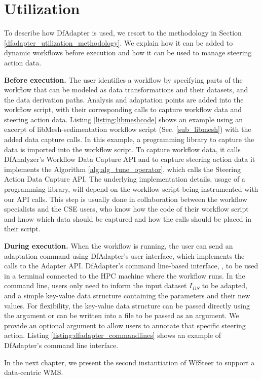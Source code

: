 \section{Utilization}
\label{dfadapter_utilization}

To describe how DfAdapter is used, we resort to the methodology in
Section \ref{dfadapter_utilization_methodology}.
We explain how it can be added to dynamic workflows before
execution and how it can be used to manage steering action data.

\textbf{Before execution.} The user identifies a workflow by specifying
parts of the workflow that can be modeled as data transformations and their
datasets, and the data derivation paths. Analysis and adaptation points are added into the workflow script, with their corresponding calls to capture
workflow data and steering action data.
Listing \ref{listing:libmeshcode} shows an example using an excerpt of
libMesh-sedimentation workflow script (Sec. \ref{sub_libmesh}) with the added
data capture calls.
In this example, a programming library to capture the data is imported into the workflow script.
To capture workflow data, it calls DfAnalyzer's Workflow Data Capture API and to capture
steering action data it implements
the Algorithm \ref{alg:alg_tune_operator}, which calls the Steering Action Data Capture API.
The underlying implementation details, \eg{} usage of a programming library,
will depend on the workflow script being instrumented with our API calls. This step is usually
done in collaboration between the workflow specialists and the CSE users, who know how
the code of their workflow script and know which data should be captured and how the calls
should be placed in their script.



\textbf{During execution\emph{. }}
When the workflow is running, the user
can send an adaptation command using DfAdapter's user interface, which implements the calls to the Adapter API.
DfAdapter's command line-based interface, ,
to be used in a terminal connected to
the HPC machine where the workflow runs.
In the command line, users only
need to inform the input dataset $I_{DS}$ to be adapted, and a
simple key-value data structure containing the parameters and their new
values. For flexibility, the key-value data structure can be passed
directly using the argument  or can be written into a file to be
passed as an argument. We provide an optional argument  to allow
users to annotate that specific steering action.
Listing \ref{listing:dfadapter_commandlines} shows an example
of DfAdapter's command line interface.








In the next chapter, we present the second instantiation of WfSteer to support a data-centric WMS.